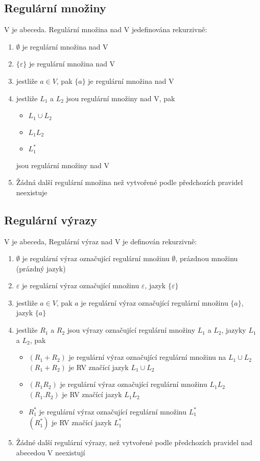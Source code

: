 \documentclass[a4paper, 11pt]{report}
\begin{document}
\subsection{Regulární množiny}
V je abeceda. Regulární množina nad V jedefinována rekurzivně:
\begin{enumerate}
	\item $\emptyset$ je regulární množina nad V
	\item $\{ \varepsilon \}$ je regulární množina nad V
	\item jestliže $a \in V$, pak $\{a\}$ je regulární množina nad V
	\item jestliže $L_1$ a $L_2$ jsou regulární množiny nad V, pak
	\begin{itemize}
		\item $L_1 \cup L_2$
		\item $L_1 L_2$
		\item $L_1^*$
	\end{itemize}
	jsou regulární množiny nad V
	\item Žádná další regulární množina než vytvořené podle předchozích pravidel neexistuje
\end{enumerate}

\subsection{Regulární výrazy}
V je abeceda, Regulární výraz nad V je definován rekurzivně:
\begin{enumerate}
	\item $\emptyset$ je regulární výraz označující regulární množinu $\emptyset$, prázdnou množinu (prázdný jazyk)
	\item $\varepsilon$ je regulární výraz označující množinu $\varepsilon$, jazyk $\{ \varepsilon \}$
	\item jestliže $a \in V$, pak $a$ je regulární výraz označující regulární množinu $\{a\}$, jazyk $\{ a \}$
	\item jestliže $R_1$ a $R_2$ jsou výrazy označující regulární množiny $L_1$ a $L_2$, jazyky $L_1$ a $L_2$, pak
	\begin{itemize}
		\item $(R_1 + R_2)$ je regulární výraz označující regulární množinu na $L_1 \cup L_2$ \\
		$(R_1 + R_2)$ je RV značící jazyk $L_1 \cup L_2$
		\item $(R_1 R_2)$ je regulární výraz označující regulární množinu  $L_1 L_2$ \\
		$(R_1 . R_2)$ je RV značící jazyk $L_1 L_2$
		\item $R_1^*$ je regulární výraz označující regulární množinu $L_1^*$ \\
		$(R_1^*)$ je RV značící jazyk $L_1^*$
	\end{itemize}
	\item Žádné další regulární výrazy, než vytvořené podle předchozích pravidel nad abecedou V neexistují
\end{enumerate}
\end{document}

